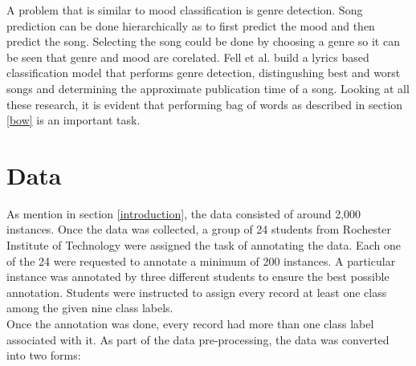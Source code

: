 \documentclass[11pt,a4paper]{article}
\begin{document}
A problem that is similar to mood classification is genre detection. Song prediction can be done hierarchically as to first predict the mood and then predict the song. Selecting the song could be done by choosing a genre so it can be seen that genre and mood are corelated. Fell et al. \cite{fell2014lyrics} build a lyrics based classification model that performs genre detection, distingushing best and worst songs and determining the approximate publication time of a song. Looking at all these research, it is evident that performing bag of words as described in section \ref{bow} is an important task.

\section{Data}
\label{data}
As mention in section \ref{introduction}, the data consisted of around 2,000 instances. Once the data was collected, a group of 24 students from Rochester Institute of Technology were assigned the task of annotating the data. Each one of the 24 were requested to annotate a minimum of 200 instances. A particular instance was annotated by three different students to ensure the best possible annotation. Students were instructed to assign every record at least one class among the given nine class labels.\\ 
Once the annotation was done, every record had more than one class label associated with it. As part of the data pre-processing, the data was converted into two forms:
\end{document}
